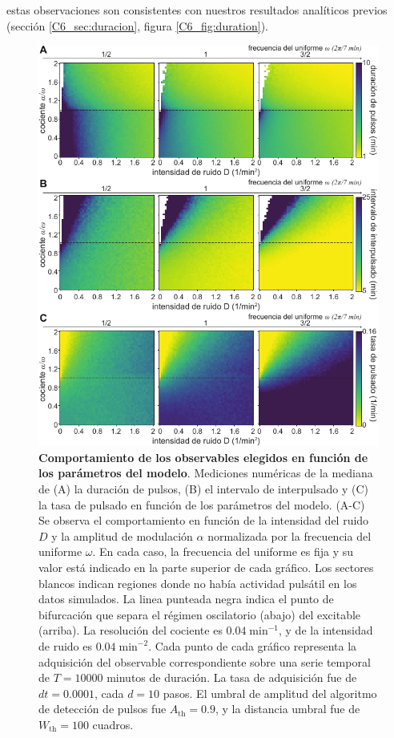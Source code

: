 \documentclass[./main.tex]{subfiles}
\begin{document}
estas observaciones son consistentes con nuestros resultados analíticos previos (sección \ref{C6_sec:duracion}, figura \ref{C6_fig:duration}).

 \begin{figure}
    \centering 
    \includegraphics[width=1\columnwidth]{figures/chapter6/C6_2d_plots.pdf} 
    \caption{\textbf{Comportamiento de los observables elegidos en función de los parámetros del modelo}. Mediciones numéricas de la mediana de (A) la duración de pulsos, (B) el intervalo de interpulsado y (C) la tasa de pulsado en función de los parámetros del modelo. (A-C) Se observa el comportamiento en función de la intensidad del ruido $D$  y la amplitud de modulación $\alpha$ normalizada por la frecuencia del uniforme $\omega$. En cada caso, la frecuencia del uniforme es fija y su valor está indicado en la parte superior de cada gráfico. Los sectores blancos indican regiones donde no había actividad pulsátil en los datos simulados. La linea punteada negra indica el punto de bifurcación que separa el régimen oscilatorio (abajo) del excitable (arriba). La resolución del cociente \dddelta es $0.04\; \text{min}^{-1}$, y de la intensidad de ruido es $0.04\; \text{min}^{-2}$. Cada punto de cada gráfico representa la adquisición del observable correspondiente sobre una serie temporal de $T = 10000$ minutos de duración. La tasa de adquisición fue de $dt = 0.0001$, cada $d = 10$ pasos. El umbral de amplitud del algoritmo de detección de pulsos fue $A_{\text{th}} = 0.9$, y la distancia umbral fue de $W_{\text{th}} = 100 $ cuadros.}
    \label{C6_fig:2d_plots}
\end{figure}
\end{document}
